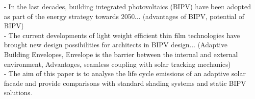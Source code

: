 
- In the last decades, building integrated photovoltaics (BIPV) have been adopted as part of the energy strategy towards 2050... (advantages of BIPV, potential of BIPV)\\

- The current developments of light weight efficient thin film technologies have brought new design possibilities for architects in BIPV design... (Adaptive Building Envelopes, Envelope is the barrier between the internal and external environment, Advantages, seamless coupling with solar tracking mechanics) \\

- The aim of this paper is to analyse the life cycle emissions of an adaptive solar facade and provide comparisons with standard shading systems and static BIPV solutions.\\